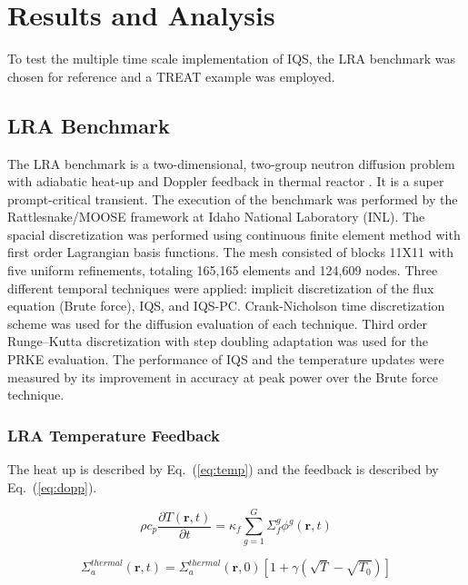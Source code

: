 \documentclass{anstrans}
\renewcommand{\vec}[1]{\bm{#1}} %
\newcommand{\eqt}[1]{Eq.~(\ref{#1})}                     %
\newcommand{\be}{\begin{equation}}
\newcommand{\ee}{\end{equation}}
\begin{document}
\section{Results and Analysis}

To test the multiple time scale implementation of IQS, the LRA benchmark was chosen for reference and a TREAT example was employed. 

\subsection{LRA Benchmark}

The LRA benchmark is a two-dimensional, two-group neutron diffusion problem with adiabatic heat-up and Doppler feedback in thermal reactor \cite{ANL_BPB}.  It is a super prompt-critical transient. The execution of the benchmark was performed by the Rattlesnake/MOOSE framework at Idaho National Laboratory (INL).  The spacial discretization was performed using continuous finite element method with first order Lagrangian basis functions. The mesh consisted of blocks 11X11 with five uniform refinements, totaling 165,165 elements and 124,609 nodes. Three different temporal techniques were applied: implicit discretization of the flux equation (Brute force), IQS, and IQS-PC. Crank-Nicholson time discretization scheme was used for the diffusion evaluation of each technique.  Third order Runge–Kutta discretization with step doubling adaptation was used for the PRKE evaluation.  The performance of IQS and the temperature updates were measured by its improvement in accuracy at peak power over the Brute force technique.

\subsubsection{LRA Temperature Feedback}
\label{sec:LRA_T}

The heat up is described by \eqt{eq:temp} and the feedback is described by \eqt{eq:dopp}.

\be
\rho c_p \frac{\partial T(\vec{r},t)}{\partial t} = \kappa_f \sum^G_{g=1}\Sigma_f^g \phi^g(\vec{r},t)
\label{eq:temp}
\ee

\be
\Sigma_a^{thermal}(\vec{r},t) = \Sigma_a^{thermal}(\vec{r},0)\left[1+\gamma\left(\sqrt{T}-\sqrt{T_0}\right)\right]
\label{eq:dopp}
\ee
\end{document}
